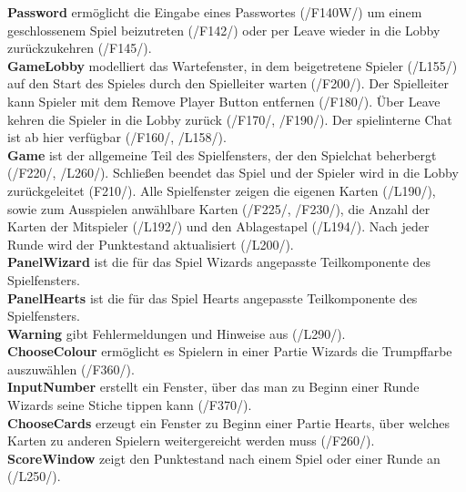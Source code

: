 \documentclass{article}
\begin{document}
			\textbf{Password} ermöglicht die Eingabe eines Passwortes (/F140W/) um einem geschlossenem Spiel beizutreten (/F142/) oder per Leave wieder in die Lobby zurückzukehren (/F145/). \\
			\textbf{GameLobby} modelliert das Wartefenster, in dem beigetretene Spieler (/L155/) auf den Start des Spieles durch den Spielleiter warten (/F200/). Der Spielleiter kann Spieler mit dem Remove Player Button entfernen (/F180/). Über Leave kehren die Spieler in die Lobby zurück (/F170/, /F190/). Der spielinterne Chat ist ab hier verfügbar (/F160/, /L158/). \\
			\textbf{Game} ist der allgemeine Teil des Spielfensters, der den Spielchat beherbergt (/F220/, /L260/). Schließen beendet das Spiel und der Spieler wird in die Lobby zurückgeleitet (F210/). Alle Spielfenster zeigen die eigenen Karten (/L190/), sowie zum Ausspielen anwählbare Karten (/F225/, /F230/), die Anzahl der Karten der Mitspieler (/L192/) und den Ablagestapel (/L194/). Nach jeder Runde wird der Punktestand  aktualisiert (/L200/).\\
			\textbf{PanelWizard} ist die für das Spiel Wizards angepasste Teilkomponente des Spielfensters.  \\
			\textbf{PanelHearts} ist die für das Spiel Hearts angepasste Teilkomponente des Spielfensters. \\
			\textbf{Warning} gibt Fehlermeldungen und Hinweise aus (/L290/). \\
			\textbf{ChooseColour} ermöglicht es Spielern in einer Partie Wizards die Trumpffarbe auszuwählen (/F360/). \\
			\textbf{InputNumber} erstellt ein Fenster, über das man zu Beginn einer Runde Wizards seine Stiche tippen kann (/F370/). \\
			\textbf{ChooseCards} erzeugt ein Fenster zu Beginn einer Partie Hearts, über welches Karten zu anderen Spielern weitergereicht werden muss (/F260/). \\
			\textbf{ScoreWindow} zeigt den Punktestand nach einem Spiel oder einer Runde an (/L250/).\\
\end{document}
